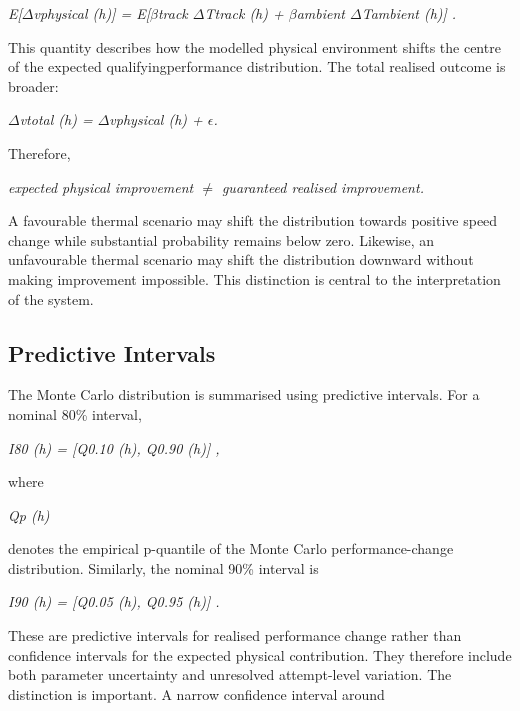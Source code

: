 \begin{center}\textit{E[\ensuremath{\Delta}vphysical (h)] = E[\ensuremath{\beta}track \ensuremath{\Delta}Ttrack (h) + \ensuremath{\beta}ambient \ensuremath{\Delta}Tambient (h)] .}\end{center}

This quantity describes how the modelled physical environment shifts the centre of the expected qualifyingperformance distribution. The total realised outcome is broader:

\begin{center}\textit{\ensuremath{\Delta}vtotal (h) = \ensuremath{\Delta}vphysical (h) + \ensuremath{\epsilon}.}\end{center}

Therefore,

\begin{center}\textit{expected physical improvement \ensuremath{\neq} guaranteed realised improvement.}\end{center}

A favourable thermal scenario may shift the distribution towards positive speed change while substantial probability remains below zero. Likewise, an unfavourable thermal scenario may shift the distribution downward without making improvement impossible. This distinction is central to the interpretation of the system.

\subsection{Predictive Intervals}
The Monte Carlo distribution is summarised using predictive intervals. For a nominal 80\% interval,

\begin{center}\textit{I80 (h) = [Q0.10 (h), Q0.90 (h)] ,}\end{center}

where

\begin{center}\textit{Qp (h)}\end{center}

denotes the empirical p-quantile of the Monte Carlo performance-change distribution. Similarly, the nominal 90\% interval is

\begin{center}\textit{I90 (h) = [Q0.05 (h), Q0.95 (h)] .}\end{center}

These are predictive intervals for realised performance change rather than confidence intervals for the expected physical contribution. They therefore include both parameter uncertainty and unresolved attempt-level variation. The distinction is important. A narrow confidence interval around

